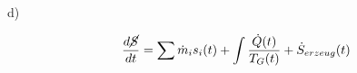 d)

\[
\frac{d\cancel{S}}{dt} = \sum \dot{m}_i s_i(t) + \int \frac{\dot{Q}(t)}{T_G(t)} + \dot{S}_{erzeug}(t)
\]
